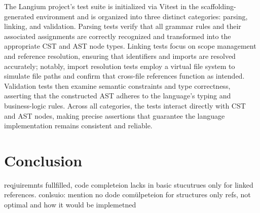The Langium project's test suite is initialized via Vitest in the scaffolding-generated environment and is organized into three distinct categories: parsing, linking,
and validation. Parsing tests verify that all grammar rules and their associated assignments are correctly recognized and transformed into the appropriate CST and AST
node types. Linking tests focus on scope management and reference resolution, ensuring that identifiers and imports are resolved accurately; notably,
import resolution tests employ a virtual file system to simulate file paths and confirm that cross-file references function as intended. Validation tests then examine
semantic constraints and type correctness, asserting that the constructed AST adheres to the language's typing and business-logic rules. Across all categories,
the tests interact directly with CST and AST nodes, making precise assertions that guarantee the language implementation remains consistent and reliable.


\chapter{Conclusion}

reqjuiremnts fullfilled, code completeion lacks in basic stucutrues only for linked references.
conlsuio: mention no dode comülpeteion for structures only refs, not optimal and how it would be implemetned